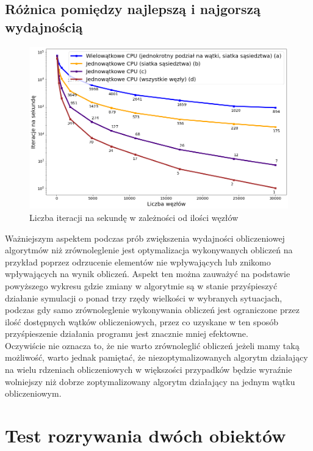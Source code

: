 \documentclass[12pt, letterpaper]{report}
\begin{document}
    \subsection{Różnica pomiędzy najlepszą i najgorszą wydajnością}
    \begin{figure}[H]
        \centering
        \includegraphics[width=16cm]{performance_all_best_worst.png}
        \caption{
            Liczba iteracji na sekundę w zależności od ilości węzłów
        }
    \end{figure}
    Ważniejszym aspektem podczas prób zwiększenia wydajności obliczeniowej algorytmów niż zrównoleglenie 
    jest optymalizacja wykonywanych obliczeń na przykład poprzez odrzucenie elementów nie wpływających 
    lub znikomo wpływających na wynik obliczeń. Aspekt ten można zauważyć na podstawie powyższego wykresu
    gdzie zmiany w algorytmie są w stanie przyśpieszyć działanie symulacji o ponad trzy rzędy wielkości w
    wybranych sytuacjach, podczas gdy samo zrównoleglenie wykonywania obliczeń jest ograniczone przez
    ilość dostępnych wątków obliczeniowych, przez co uzyskane w ten sposób przyśpieszenie działania 
    programu jest znacznie mniej efektowne. \\
    
    Oczywiście nie oznacza to, że nie warto zrównoleglić obliczeń
    jeżeli mamy taką możliwość, warto jednak pamiętać, że niezoptymalizowanych algorytm działający 
    na wielu rdzeniach obliczeniowych w większości przypadków będzie wyraźnie wolniejszy niż dobrze
    zoptymalizowany algorytm działający na jednym wątku obliczeniowym.

    \clearpage
    \section{Test rozrywania dwóch obiektów}
\end{document}
